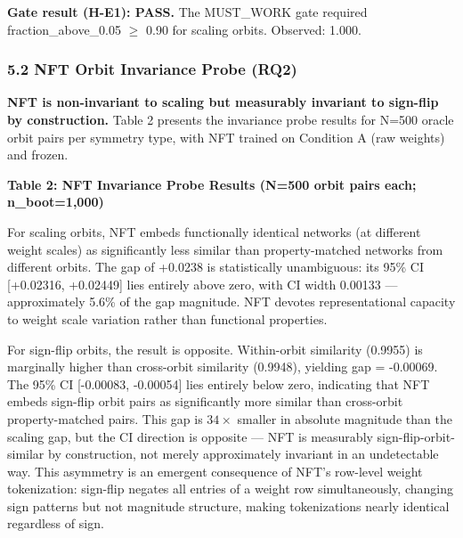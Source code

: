 \textbf{Gate result (H-E1): PASS.} The MUST\_WORK gate required fraction\_above\_0.05 $\geq$ 0.90 for scaling orbits. Observed: 1.000.

\subsubsection{5.2 NFT Orbit Invariance Probe (RQ2)}

\textbf{NFT is non-invariant to scaling but measurably invariant to sign-flip by construction.} Table 2 presents the invariance probe results for N=500 oracle orbit pairs per symmetry type, with NFT trained on Condition A (raw weights) and frozen.

\textbf{Table 2: NFT Invariance Probe Results (N=500 orbit pairs each; n\_boot=1,000)}

\begin{table}[htbp]
\centering
{}
\end{table}

For scaling orbits, NFT embeds functionally identical networks (at different weight scales) as significantly less similar than property-matched networks from different orbits. The gap of +0.0238 is statistically unambiguous: its 95\% CI [+0.02316, +0.02449] lies entirely above zero, with CI width 0.00133 --- approximately 5.6\% of the gap magnitude. NFT devotes representational capacity to weight scale variation rather than functional properties.

For sign-flip orbits, the result is opposite. Within-orbit similarity (0.9955) is marginally higher than cross-orbit similarity (0.9948), yielding gap = -0.00069. The 95\% CI [-0.00083, -0.00054] lies entirely below zero, indicating that NFT embeds sign-flip orbit pairs as significantly more similar than cross-orbit property-matched pairs. This gap is $34\times$ smaller in absolute magnitude than the scaling gap, but the CI direction is opposite --- NFT is measurably sign-flip-orbit-similar by construction, not merely approximately invariant in an undetectable way. This asymmetry is an emergent consequence of NFT's row-level weight tokenization: sign-flip negates all entries of a weight row simultaneously, changing sign patterns but not magnitude structure, making tokenizations nearly identical regardless of sign.

